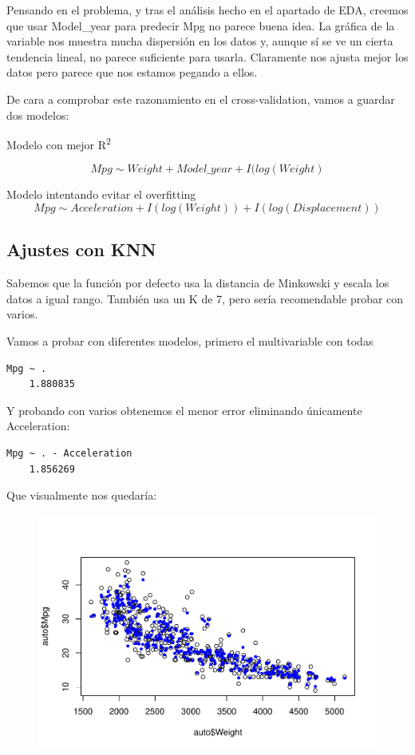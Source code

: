 Pensando en el problema, y tras el análisis hecho en el apartado de EDA, creemos que usar Model\_year para predecir Mpg no parece buena idea. La gráfica de la variable nos muestra mucha dispersión en los datos y, aunque sí se ve un cierta tendencia lineal, no parece suficiente para usarla. Claramente nos ajusta mejor los datos pero parece que nos estamos pegando a ellos.

De cara a comprobar este razonamiento en el cross-validation, vamos a guardar dos modelos: 

\vspace{\baselineskip}
Modelo con mejor R\textsuperscript{2} 

\begin{equation}    
    Mpg \sim Weight + Model\_year + I(log(Weight)
\end{equation}

Modelo intentando evitar el overfitting
\begin{equation}    
    Mpg \sim Acceleration + I(log(Weight)) + I(log(Displacement))
\end{equation}

\subsection{Ajustes con KNN}

Sabemos que la función por defecto usa la distancia de Minkowski y escala los datos a igual rango. También usa un K de 7, pero sería recomendable probar con varios.

\vspace{\baselineskip}

Vamos a probar con diferentes modelos, primero el multivariable con todas
\begin{verbatim}
Mpg ~ .
    1.880835
\end{verbatim}

Y probando con varios obtenemos el menor error eliminando únicamente Acceleration:
\begin{verbatim}
Mpg ~ . - Acceleration    
    1.856269
\end{verbatim}

\newpage

Que visualmente nos quedaría:
\begin{figure}[H]\includegraphics[width=.9\linewidth]{img/Regresion_files/figure-latex/unnamed-chunk-29-1} \caption{}\end{figure}

